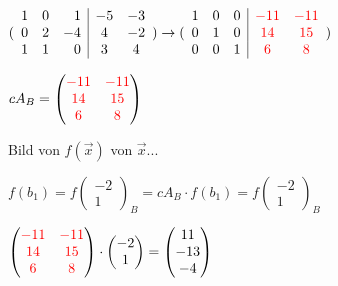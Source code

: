 \begin{multicols*}{3}
    {$( \begin{array}{rrr|cc}
                1 & 0 & 1  & -5 & -3 \\
                0 & 2 & -4 & 4  & -2 \\
                1 & 1 & 0  & 3  & 4
            \end{array})
            \to
            (\begin{array}{rrr|cc}
                    1 & 0 & 0 & {\color{red}-11} & {\color{red}-11} \\
                    0 & 1 & 0 & {\color{red}14}  & {\color{red}15}  \\
                    0 & 0 & 1 & {\color{red}6}   & {\color{red}8}
                \end{array})
        $}

    {$cA_B = \begin{pmatrix}
                {\color{red}-11} & {\color{red}-11} \\
                {\color{red}14}  & {\color{red}15}  \\
                {\color{red}6}   & {\color{red}8}
            \end{pmatrix}$}


    { Bild von $f(\vec{x})$ von $\vec{x} ... $}

    {$ f(b_1) = f(\begin{matrix}
                -2 \\
                1
            \end{matrix})_B = cA_B \cdot f(b_1) = f(\begin{matrix}
                -2 \\
                1
            \end{matrix})_B$}

    {$\begin{pmatrix}
                {\color{red}-11} & {\color{red}-11} \\
                {\color{red}14}  & {\color{red}15}  \\
                {\color{red}6}   & {\color{red}8}
            \end{pmatrix} \cdot \begin{pmatrix}
                -2 \\
                1
            \end{pmatrix} = \begin{pmatrix}
                11  \\
                -13 \\
                -4
            \end{pmatrix}$}


\end{multicols*}
